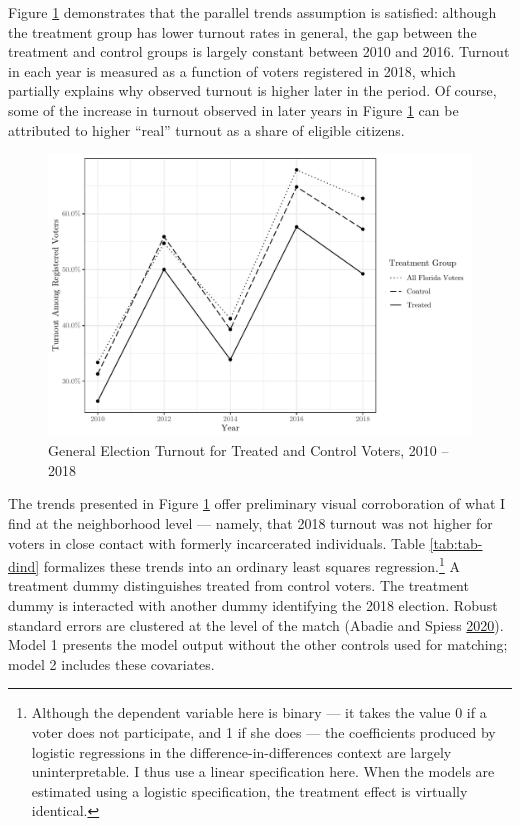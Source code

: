 \documentclass[
  12pt,
]{article}
\begin{document}
Figure \ref{fig:dind} demonstrates that the parallel trends assumption is satisfied: although the treatment group has lower turnout rates in general, the gap between the treatment and control groups is largely constant between 2010 and 2016. Turnout in each year is measured as a function of voters registered in 2018, which partially explains why observed turnout is higher later in the period. Of course, some of the increase in turnout observed in later years in Figure \ref{fig:dind} can be attributed to higher ``real'' turnout as a share of eligible citizens.

\begin{figure}[H]

{\centering \includegraphics{amendment_4_turnout_files/figure-latex/dind-1} 

}

\caption{\label{fig:dind}General Election Turnout for Treated and Control Voters, 2010 -- 2018}\label{fig:dind}
\end{figure}

The trends presented in Figure \ref{fig:dind} offer preliminary visual corroboration of what I find at the neighborhood level --- namely, that 2018 turnout was not higher for voters in close contact with formerly incarcerated individuals. Table \ref{tab:tab-dind} formalizes these trends into an ordinary least squares regression.\footnote{Although the dependent variable here is binary --- it takes the value 0 if a voter does not participate, and 1 if she does --- the coefficients produced by logistic regressions in the difference-in-differences context are largely uninterpretable. I thus use a linear specification here. When the models are estimated using a logistic specification, the treatment effect is virtually identical.} A treatment dummy distinguishes treated from control voters. The treatment dummy is interacted with another dummy identifying the 2018 election. Robust standard errors are clustered at the level of the match (Abadie and Spiess \protect\hyperlink{ref-Abadie2020}{2020}). Model 1 presents the model output without the other controls used for matching; model 2 includes these covariates.
\end{document}
